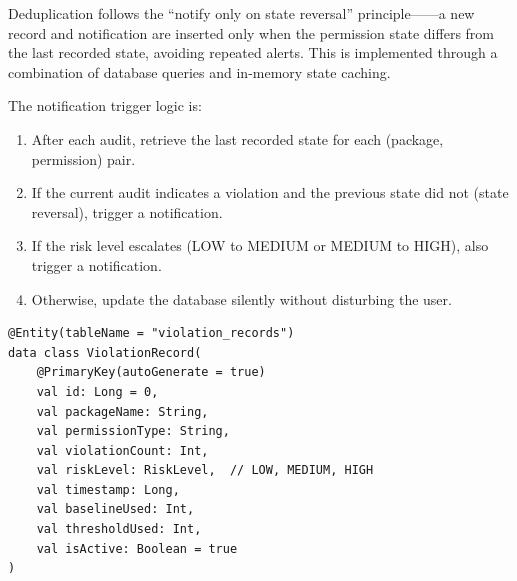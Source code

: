 Deduplication follows the ``notify only on state reversal'' principle——a new record and notification are inserted only when the permission state differs from the last recorded state, avoiding repeated alerts. This is implemented through a combination of database queries and in-memory state caching.

The notification trigger logic is:
\begin{enumerate}
\item After each audit, retrieve the last recorded state for each (package, permission) pair.
\item If the current audit indicates a violation and the previous state did not (state reversal), trigger a notification.
\item If the risk level escalates (LOW to MEDIUM or MEDIUM to HIGH), also trigger a notification.
\item Otherwise, update the database silently without disturbing the user.
\end{enumerate}

\begin{lstlisting}[caption=Room entity for violation records]
@Entity(tableName = "violation_records")
data class ViolationRecord(
    @PrimaryKey(autoGenerate = true)
    val id: Long = 0,
    val packageName: String,
    val permissionType: String,
    val violationCount: Int,
    val riskLevel: RiskLevel,  // LOW, MEDIUM, HIGH
    val timestamp: Long,
    val baselineUsed: Int,
    val thresholdUsed: Int,
    val isActive: Boolean = true
)
\end{lstlisting}
